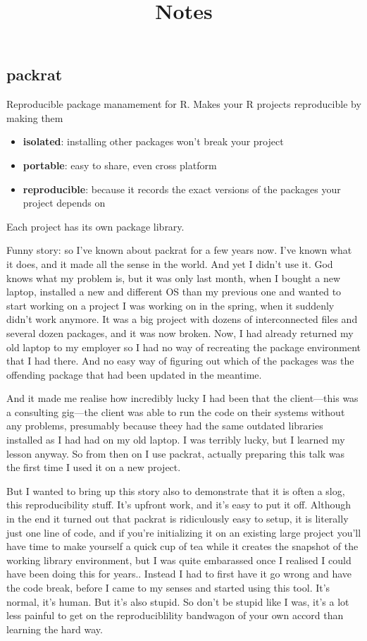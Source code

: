 \documentclass[]{article}
\title{Notes}
\author{}
\date{}
\providecommand{\tightlist}{%
  \setlength{\itemsep}{0pt}\setlength{\parskip}{0pt}}
\begin{document}
\maketitle

\hypertarget{packrat}{%
\subsection{packrat}\label{packrat}}

Reproducible package manamement for R. Makes your R projects
reproducible by making them

\begin{itemize}
\tightlist
\item
  \textbf{isolated}: installing other packages won't break your project
\item
  \textbf{portable}: easy to share, even cross platform
\item
  \textbf{reproducible}: because it records the exact versions of the
  packages your project depends on
\end{itemize}

Each project has its own package library.

Funny story: so I've known about packrat for a few years now. I've known
what it does, and it made all the sense in the world. And yet I didn't
use it. God knows what my problem is, but it was only last month, when I
bought a new laptop, installed a new and different OS than my previous
one and wanted to start working on a project I was working on in the
spring, when it suddenly didn't work anymore. It was a big project with
dozens of interconnected files and several dozen packages, and it was
now broken. Now, I had already returned my old laptop to my employer so
I had no way of recreating the package environment that I had there. And
no easy way of figuring out which of the packages was the offending
package that had been updated in the meantime.

And it made me realise how incredibly lucky I had been that the
client---this was a consulting gig---the client was able to run the code
on their systems without any problems, presumably because theey had the
same outdated libraries installed as I had had on my old laptop. I was
terribly lucky, but I learned my lesson anyway. So from then on I use
packrat, actually preparing this talk was the first time I used it on a
new project.

But I wanted to bring up this story also to demonstrate that it is often
a slog, this reproducibility stuff. It's upfront work, and it's easy to
put it off. Although in the end it turned out that packrat is
ridiculously easy to setup, it is literally just one line of code, and
if you're initializing it on an existing large project you'll have time
to make yourself a quick cup of tea while it creates the snapshot of the
working library environment, but I was quite embarassed once I realised
I could have been doing this for years.. Instead I had to first have it
go wrong and have the code break, before I came to my senses and started
using this tool. It's normal, it's human. But it's also stupid. So don't
be stupid like I was, it's a lot less painful to get on the
reproduciblility bandwagon of your own accord than learning the hard
way.
\end{document}

